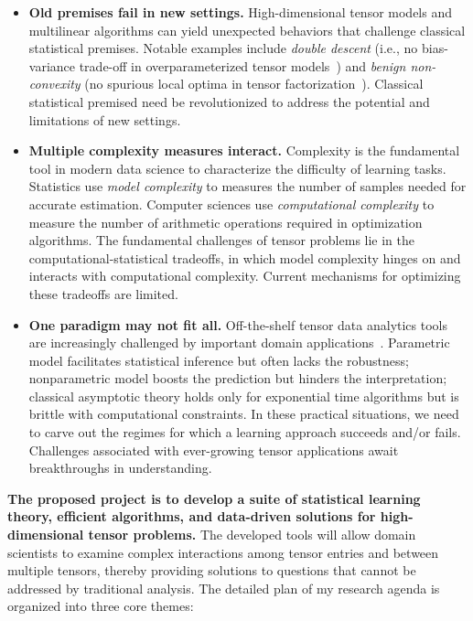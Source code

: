 \documentclass[11pt]{article}
\theoremstyle{exampstyle}
\theoremstyle{definition}
\begin{document}
\begin{itemize}[wide,labelwidth=!, labelindent=0pt,itemsep=0ex,parsep=0ex,topsep=-3pt]
\item {\bf Old premises fail in new settings.} High-dimensional tensor models and multilinear algorithms can yield unexpected behaviors that challenge classical statistical premises. Notable examples include {\it double descent} (i.e., no bias-variance trade-off in overparameterized tensor models~\cite{NEURIPS2020_f9d3a954, belkin2019reconciling}) and \emph{benign non-convexity} (no spurious local optima in tensor factorization~\cite{ge2020optimization}). Classical statistical premised need be revolutionized to address the potential and limitations of new settings. 
\item {\bf Multiple complexity measures interact.} Complexity is the fundamental tool in modern data science to characterize the difficulty of learning tasks. Statistics use {\it model complexity} to measures the number of samples needed for accurate estimation. Computer sciences use {\it computational complexity} to measure the number of arithmetic operations required in optimization algorithms. The fundamental challenges of tensor problems lie in the computational-statistical tradeoffs, in which model complexity hinges on and interacts with computational complexity. Current mechanisms for optimizing these tradeoffs are limited.
\item {\bf One paradigm may not fit all.} Off-the-shelf tensor data analytics tools are increasingly challenged by important domain applications~\cite{murdoch2019definitions}. Parametric model facilitates statistical inference but often lacks the robustness; nonparametric model boosts the prediction but hinders the interpretation; classical asymptotic theory holds only for exponential time algorithms but is brittle with computational constraints. In these practical situations, we need to carve out the regimes for which a learning approach succeeds and/or fails. Challenges associated with ever-growing tensor applications await breakthroughs in understanding. 
\end{itemize}

 {\bf The proposed project is to develop a suite of statistical learning theory, efficient algorithms, and data-driven solutions for high-dimensional tensor problems.} The developed tools will allow domain scientists to examine complex interactions among tensor entries and between multiple tensors, thereby providing solutions to questions that cannot be addressed by traditional analysis.  The detailed plan of my research agenda is organized into three core themes: 
 
\end{document}
